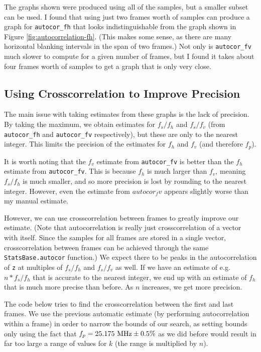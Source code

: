 \documentclass{article}
\newcommand*{\code}[1]{\texttt{#1}}
\begin{document}
The graphs shown were produced using all of the samples, but a smaller subset can be used. I found that using just two frames worth of samples can produce a graph for \code{autocor_fh} that looks indistinguishable from the graph shown in Figure \ref{fig:autocorrelation-fh}. (This makes some sense, as there are many horizontal blanking intervals in the span of two frames.) Not only is \code{autocor_fv} much slower to compute for a given number of frames, but I found it takes about four frames worth of samples to get a graph that is only very close.

\subsection*{Using Crosscorrelation to Improve Precision}

The main issue with taking estimates from these graphs is the lack of precision. By taking the maximum, we obtain estimates for $f_s / f_h$ and $f_s / f_v$ (from \code{autocor_fh} and \code{autocor_fv} respectively), but these are only to the nearest integer. This limits the precision of the estimates for $f_h$ and $f_v$ (and therefore $f_p$).

It is worth noting that the $f_v$ estimate from \code{autocor_fv} is better than the $f_h$ estimate from \code{autocor_fv}. This is because $f_h$ is much larger than $f_v$, meaning $f_s / f_h$ is much smaller, and so more precision is lost by rounding to the nearest integer. However, even the estimate from $autocor_fv$ appears slightly worse than my manual estimate.

However, we can use crosscorrelation between frames to greatly improve our estimate. (Note that autocorrelation is really just crosscorrelation of a vector with itself. Since the samples for all frames are stored in a single vector, crosscorrelation between frames can be achieved through the same \code{StatsBase.autocor} function.) We expect there to be peaks in the autocorrelation of \code{z} at multiples of $f_s / f_h$ and $f_s / f_v$ as well. If we have an estimate of e.g. $n * f_s / f_h$ that is accurate to the nearest integer, we end up with an estimate of $f_h$ that is much more precise than before. As $n$ increases, we get more precision.

The code below tries to find the crosscorrelation between the first and last frames. We use the previous automatic estimate (by performing autocorrelation within a frame) in order to narrow the bounds of our search, as setting bounds only using the fact that $f_p = \textnormal{25.175 MHz} \pm \textnormal{0.5\%}$ as we did before would result in far too large a range of values for $k$ (the range is multiplied by $n$).
\end{document}
